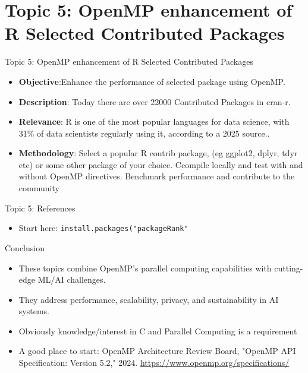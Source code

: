 \documentclass{beamer}
\begin{document}
\section{Topic 5: OpenMP enhancement of R Selected Contributed Packages}
\begin{frame}{Topic 5: OpenMP enhancement of R Selected Contributed Packages}
\begin{itemize}
    \item \textbf{Objective}:Enhance the performance of selected package using OpenMP.
    \item \textbf{Description}: Today there are over 22000 Contributed Packages in cran-r.
    \item \textbf{Relevance}: R is one of the most popular languages for data science, with 31\% 
    of data scientists regularly using it, according to a 2025 source..
    \item \textbf{Methodology}: Select a popular R contrib package, (eg ggplot2, dplyr, tdyr etc)
    or some other package of your choice. Ccompile locally and test with and without
    OpenMP directives. Benchmark performance and contribute to the community
\end{itemize}
\end{frame}

\begin{frame}{Topic 5: References}
\begin{itemize}
    \item Start here: \texttt{install.packages("packageRank"}

\end{itemize}
\end{frame}

\begin{frame}{Conclusion}
\begin{itemize}
    \item These topics combine OpenMP's parallel computing capabilities with cutting-edge ML/AI challenges.
    \item They address performance, scalability, privacy, and sustainability in AI systems.
    \item Obviously knowledge/interest in C and Parallel Computing
    is a requirement
    \item A good place to start: OpenMP Architecture Review Board, "OpenMP API Specification: Version 5.2," 2024. \url{https://www.openmp.org/specifications/}
\end{itemize}
\end{frame}
\end{document}
